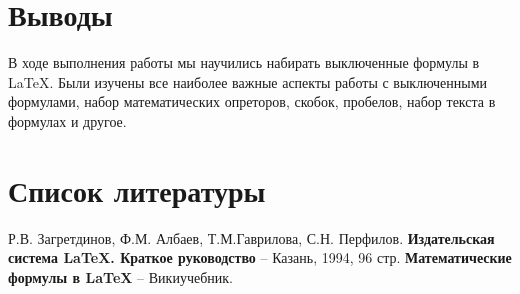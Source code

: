 \documentclass[a4paper,12pt]{article}
\begin{document}
{\section{Выводы}
\hspace{1.25cm}В ходе выполнения работы мы научились набирать выключенные формулы в LaTeX.
Были изучены все наиболее важные аспекты работы с выключенными формулами, набор математических опреторов, скобок, пробелов, набор текста в формулах и другое.
\clearpage

\section{Список литературы}
\renewcommand\refname{}
\begin{thebibliography}{2}
    \bibitem{} 
    Р.В. Загретдинов, Ф.М. Албаев, Т.М.Гаврилова, С.Н. Перфилов. 
    {\bf Издательская система LaTeX. Краткое руководство} -- 
    Казань, 
    1994, 
    96 стр.
    \bibitem{} 
    {\bf Математические формулы в LaTeX} -- 
    Викиучебник. 
\end{thebibliography}
}
\end{document}
